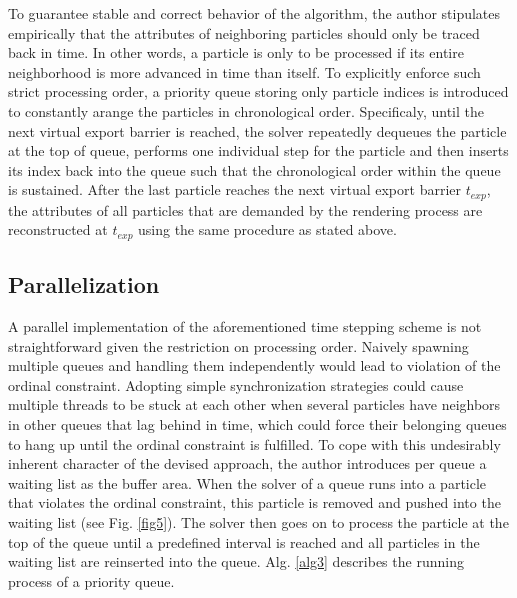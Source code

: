 \documentclass[
	11pt, 
	DIV10,
	ngerman,
	a4paper, 
	oneside, 
	headings=normal, 
	captions=tableheading,
	final, 
	numbers=noenddot
]{scrartcl}
\begin{document}
To guarantee stable and correct behavior of the algorithm, the author stipulates empirically that the attributes of neighboring particles should only be traced back in time. In other words, a particle is only to be processed if its entire neighborhood is more advanced in time than itself. To explicitly enforce such strict processing order, a priority queue storing only particle indices is introduced to constantly arange the particles in chronological order. Specificaly, until the next virtual export barrier is reached, the solver repeatedly dequeues the particle at the top of queue, performs one individual step for the particle and then inserts its index back into the queue such that the chronological order within the queue is sustained. After the last particle reaches the next virtual export barrier $t_{exp}$, the attributes of all particles that are demanded by the rendering process are reconstructed at $t_{exp}$ using the same procedure as stated above.

\subsection{Parallelization}

A parallel implementation of the aforementioned time stepping scheme is not straightforward given the restriction on processing order. Naively spawning multiple queues and handling them independently would lead to violation of the ordinal constraint. Adopting simple synchronization strategies could cause multiple threads to be stuck at each other when several particles have neighbors in other queues that lag behind in time, which could force their belonging queues to hang up until the ordinal constraint is fulfilled. To cope with this undesirably inherent character of the devised approach, the author introduces per queue a waiting list as the buffer area. When the solver of a queue runs into a particle that violates the ordinal constraint, this particle is removed and pushed into the waiting list (see Fig. \ref{fig5}). The solver then goes on to process the particle at the top of the queue until a predefined interval is reached and all particles in the waiting list are reinserted into the queue. Alg. \ref{alg3} describes the running process of a priority queue.
\end{document}
